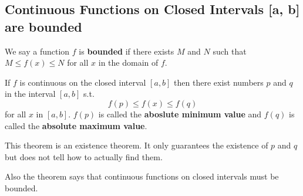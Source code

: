 \documentclass[../main.tex]{subfiles}
\begin{document}


\subsection*{Continuous Functions on Closed Intervals [a, b] are bounded}
We say a function $f$ is \textbf{bounded} if there exists $M$ and $N$ such that $M \le f(x) \le N$ for all $x$ in the domain of $f$.

\begin{theorem}
	If $f$ is continuous on the closed interval $[a, b]$ then there exist numbers $p$ and $q$ in the interval $[a,b]$ s.t.
	\[
		f(p) \leq f(x) \leq f(q)
	\]
	for all $x$ in $[a, b]$.
	$f(p)$ is called the \textbf{aboslute minimum value} and $f(q)$ is called the \textbf{absolute maximum value}.
\end{theorem}

This theorem is an existence theorem. It only guarantees the existence of $p$ and $q$ but does not tell how to actually find them.

Also the theorem says that continuous functions on closed intervals must be bounded.
\end{document}
